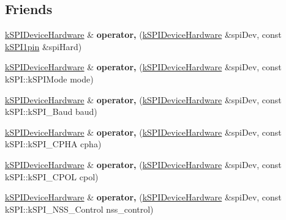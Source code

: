 \subsection*{Friends}
\begin{DoxyCompactItemize}
\item 
\hyperlink{classkSPIDeviceHardware}{k\+S\+P\+I\+Device\+Hardware} \& {\bfseries operator,} (\hyperlink{classkSPIDeviceHardware}{k\+S\+P\+I\+Device\+Hardware} \&spi\+Dev, const \hyperlink{structkSPI1pin}{k\+S\+P\+I1pin} \&spi\+Hard)\hypertarget{classkSPIDeviceHardware_a233dc15697785ac12db215087a19977b}{}\label{classkSPIDeviceHardware_a233dc15697785ac12db215087a19977b}

\item 
\hyperlink{classkSPIDeviceHardware}{k\+S\+P\+I\+Device\+Hardware} \& {\bfseries operator,} (\hyperlink{classkSPIDeviceHardware}{k\+S\+P\+I\+Device\+Hardware} \&spi\+Dev, const k\+S\+P\+I\+::k\+S\+P\+I\+Mode mode)\hypertarget{classkSPIDeviceHardware_a38f361c44f1d601d4070393dc713220f}{}\label{classkSPIDeviceHardware_a38f361c44f1d601d4070393dc713220f}

\item 
\hyperlink{classkSPIDeviceHardware}{k\+S\+P\+I\+Device\+Hardware} \& {\bfseries operator,} (\hyperlink{classkSPIDeviceHardware}{k\+S\+P\+I\+Device\+Hardware} \&spi\+Dev, const k\+S\+P\+I\+::k\+S\+P\+I\+\_\+\+Baud baud)\hypertarget{classkSPIDeviceHardware_ac79b4c18515b69dffa81066e69b23791}{}\label{classkSPIDeviceHardware_ac79b4c18515b69dffa81066e69b23791}

\item 
\hyperlink{classkSPIDeviceHardware}{k\+S\+P\+I\+Device\+Hardware} \& {\bfseries operator,} (\hyperlink{classkSPIDeviceHardware}{k\+S\+P\+I\+Device\+Hardware} \&spi\+Dev, const k\+S\+P\+I\+::k\+S\+P\+I\+\_\+\+C\+P\+HA cpha)\hypertarget{classkSPIDeviceHardware_acf00881fad01697aa7ff8c058618969f}{}\label{classkSPIDeviceHardware_acf00881fad01697aa7ff8c058618969f}

\item 
\hyperlink{classkSPIDeviceHardware}{k\+S\+P\+I\+Device\+Hardware} \& {\bfseries operator,} (\hyperlink{classkSPIDeviceHardware}{k\+S\+P\+I\+Device\+Hardware} \&spi\+Dev, const k\+S\+P\+I\+::k\+S\+P\+I\+\_\+\+C\+P\+OL cpol)\hypertarget{classkSPIDeviceHardware_acf990179b76570518d59ce6baa7be6cf}{}\label{classkSPIDeviceHardware_acf990179b76570518d59ce6baa7be6cf}

\item 
\hyperlink{classkSPIDeviceHardware}{k\+S\+P\+I\+Device\+Hardware} \& {\bfseries operator,} (\hyperlink{classkSPIDeviceHardware}{k\+S\+P\+I\+Device\+Hardware} \&spi\+Dev, const k\+S\+P\+I\+::k\+S\+P\+I\+\_\+\+N\+S\+S\+\_\+\+Control nss\+\_\+control)\hypertarget{classkSPIDeviceHardware_aecea7355baf6a0481936de37539431f0}{}\label{classkSPIDeviceHardware_aecea7355baf6a0481936de37539431f0}


\end{DoxyCompactItemize}
